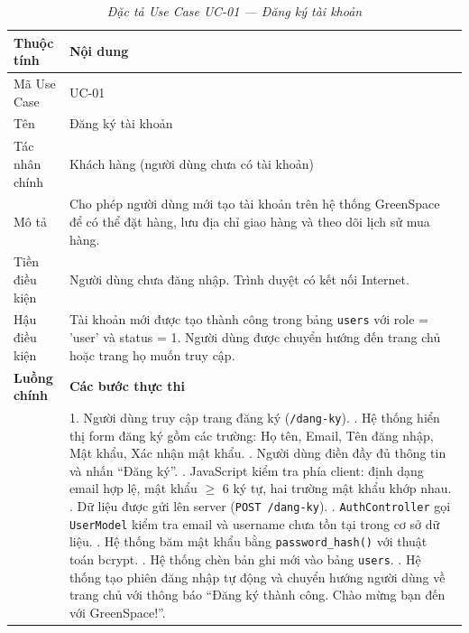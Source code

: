 \documentclass[11pt, a4paper]{article}
\begin{document}
\begin{table}[H]
    \centering
    \small
    \setlength{\tabcolsep}{2pt}
    \renewcommand{\arraystretch}{2.0}
    \caption{\textit{Đặc tả Use Case UC-01 --- Đăng ký tài khoản}}
    \vspace{0.3cm}
    \begin{tabularx}{\linewidth}{|>{\raggedright\arraybackslash}p{3.3cm}|Y|}
        \hline
        \textbf{Thuộc tính} & \textbf{Nội dung} \\ \hline
        Mã Use Case & UC-01 \\ \hline
        Tên & Đăng ký tài khoản \\ \hline
        Tác nhân chính & Khách hàng (người dùng chưa có tài khoản) \\ \hline
        Mô tả & Cho phép người dùng mới tạo tài khoản trên hệ thống GreenSpace để có thể đặt hàng, lưu địa chỉ giao hàng và theo dõi lịch sử mua hàng. \\ \hline
        Tiền điều kiện & Người dùng chưa đăng nhập. Trình duyệt có kết nối Internet. \\ \hline
        Hậu điều kiện & Tài khoản mới được tạo thành công trong bảng \texttt{users} với role = 'user' và status = 1. Người dùng được chuyển hướng đến trang chủ hoặc trang họ muốn truy cập. \\ \hline
        \textbf{Luồng chính} & \textbf{Các bước thực thi} \\ \hline
        & 1. Người dùng truy cập trang đăng ký (\texttt{/dang-ky}). . Hệ thống hiển thị form đăng ký gồm các trường: Họ tên, Email, Tên đăng nhập, Mật khẩu, Xác nhận mật khẩu. . Người dùng điền đầy đủ thông tin và nhấn ``Đăng ký''. . JavaScript kiểm tra phía client: định dạng email hợp lệ, mật khẩu $\geq$ 6 ký tự, hai trường mật khẩu khớp nhau. . Dữ liệu được gửi lên server (\texttt{POST /dang-ky}). . \texttt{AuthController} gọi \texttt{UserModel} kiểm tra email và username chưa tồn tại trong cơ sở dữ liệu. . Hệ thống băm mật khẩu bằng \texttt{password\_hash()} với thuật toán bcrypt. . Hệ thống chèn bản ghi mới vào bảng \texttt{users}. . Hệ thống tạo phiên đăng nhập tự động và chuyển hướng người dùng về trang chủ với thông báo ``Đăng ký thành công. Chào mừng bạn đến với GreenSpace!''. \\ \hline

\end{tabularx}
\end{table}
\end{document}

